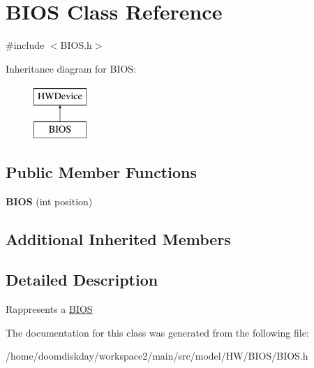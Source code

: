 \hypertarget{classBIOS}{}\section{B\+I\+OS Class Reference}
\label{classBIOS}


{\ttfamily \#include $<$B\+I\+O\+S.\+h$>$}

Inheritance diagram for B\+I\+OS\+:\begin{figure}[H]
\begin{center}
\leavevmode
\includegraphics[height=2.000000cm]{classBIOS}
\end{center}
\end{figure}
\subsection*{Public Member Functions}
\begin{DoxyCompactItemize}
\item 
{\bfseries B\+I\+OS} (int position)\hypertarget{classBIOS_adbe126d9247cb1262747f838258bffce}{}\label{classBIOS_adbe126d9247cb1262747f838258bffce}

\end{DoxyCompactItemize}
\subsection*{Additional Inherited Members}


\subsection{Detailed Description}
Rappresents a \hyperlink{classBIOS}{B\+I\+OS} 

The documentation for this class was generated from the following file\+:\begin{DoxyCompactItemize}
\item 
/home/doomdiskday/workspace2/main/src/model/\+H\+W/\+B\+I\+O\+S/B\+I\+O\+S.\+h\end{DoxyCompactItemize}
